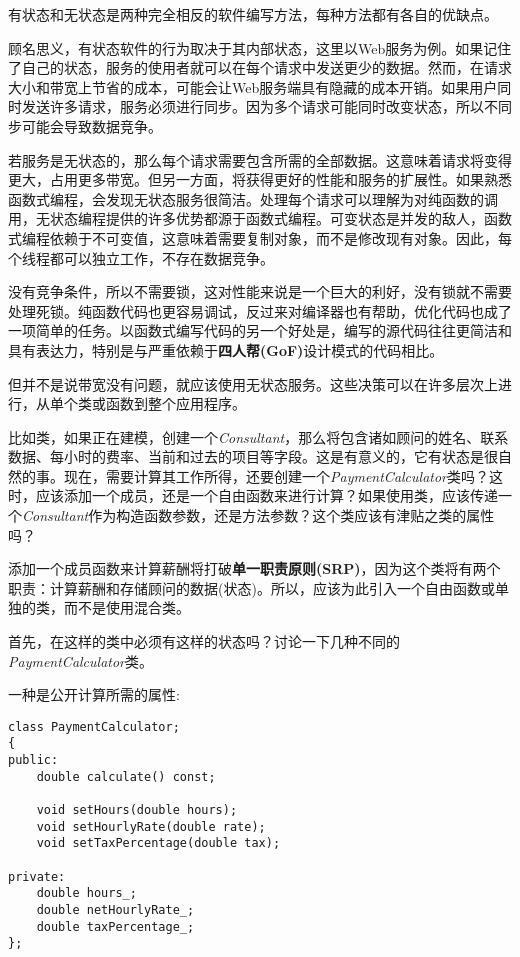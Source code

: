 
有状态和无状态是两种完全相反的软件编写方法，每种方法都有各自的优缺点。

顾名思义，有状态软件的行为取决于其内部状态，这里以Web服务为例。如果记住了自己的状态，服务的使用者就可以在每个请求中发送更少的数据。然而，在请求大小和带宽上节省的成本，可能会让Web服务端具有隐藏的成本开销。如果用户同时发送许多请求，服务必须进行同步。因为多个请求可能同时改变状态，所以不同步可能会导致数据竞争。

若服务是无状态的，那么每个请求需要包含所需的全部数据。这意味着请求将变得更大，占用更多带宽。但另一方面，将获得更好的性能和服务的扩展性。如果熟悉函数式编程，会发现无状态服务很简洁。处理每个请求可以理解为对纯函数的调用，无状态编程提供的许多优势都源于函数式编程。可变状态是并发的敌人，函数式编程依赖于不可变值，这意味着需要复制对象，而不是修改现有对象。因此，每个线程都可以独立工作，不存在数据竞争。

没有竞争条件，所以不需要锁，这对性能来说是一个巨大的利好，没有锁就不需要处理死锁。纯函数代码也更容易调试，反过来对编译器也有帮助，优化代码也成了一项简单的任务。以函数式编写代码的另一个好处是，编写的源代码往往更简洁和具有表达力，特别是与严重依赖于\textbf{四人帮(GoF)}设计模式的代码相比。

但并不是说带宽没有问题，就应该使用无状态服务。这些决策可以在许多层次上进行，从单个类或函数到整个应用程序。

比如类，如果正在建模，创建一个\textit{Consultant}，那么将包含诸如顾问的姓名、联系数据、每小时的费率、当前和过去的项目等字段。这是有意义的，它有状态是很自然的事。现在，需要计算其工作所得，还要创建一个\textit{PaymentCalculator}类吗？这时，应该添加一个成员，还是一个自由函数来进行计算？如果使用类，应该传递一个\textit{Consultant}作为构造函数参数，还是方法参数？这个类应该有津贴之类的属性吗？

添加一个成员函数来计算薪酬将打破\textbf{单一职责原则(SRP)}，因为这个类将有两个职责：计算薪酬和存储顾问的数据(状态)。所以，应该为此引入一个自由函数或单独的类，而不是使用混合类。

首先，在这样的类中必须有这样的状态吗？讨论一下几种不同的\textit{PaymentCalculator}类。

一种是公开计算所需的属性:

\begin{lstlisting}[style=styleCXX]
class PaymentCalculator;
{
public:
	double calculate() const;
	
	void setHours(double hours);
	void setHourlyRate(double rate);
	void setTaxPercentage(double tax);
	
private:
	double hours_;
	double netHourlyRate_;
	double taxPercentage_;
};
\end{lstlisting}

